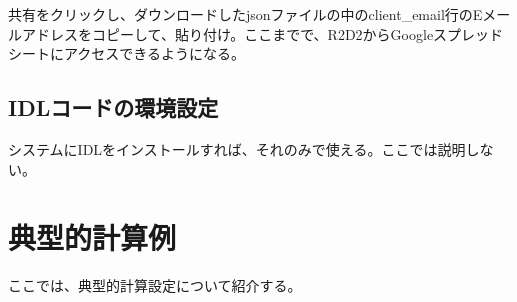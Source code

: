 \documentclass[letterpaper,10pt,dvipdfmx,report]{sphinxmanual}
\begin{document}
共有をクリックし、ダウンロードしたjsonファイルの中のclient\_email行のEメールアドレスをコピーして、貼り付け。ここまでで、R2D2からGoogleスプレッドシートにアクセスできるようになる。


\section{IDLコードの環境設定}
\label{\detokenize{environment:idl}}
システムにIDLをインストールすれば、それのみで使える。ここでは説明しない。


\chapter{典型的計算例}
\label{\detokenize{typical_case:id1}}\label{\detokenize{typical_case::doc}}
ここでは、典型的計算設定について紹介する。
\end{document}
